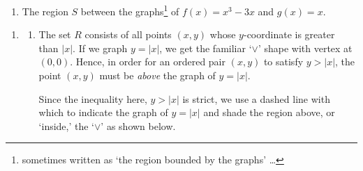 \documentclass{ximera}
\begin{document}
\begin{example}
\begin{enumerate}
\begin{enumerate}
\begin{image}
\end{image}

\item  The region $S$ between the graphs\footnote{sometimes written as `the region bounded by the graphs' \ldots} of $f(x) = x^3-3x$ and $g(x) = x$.


\end{enumerate}


\end{enumerate}

\begin{explanation} 

\begin{enumerate}

\item 

\begin{enumerate}

\item  The set $R$ consists of all points $(x,y)$ whose $y$-coordinate is greater than $|x|$.  If we graph $y=|x|$, we get the familiar `$\vee$' shape with vertex at $(0,0)$.  Hence, in order for an ordered pair $(x,y)$ to satisfy  $y > |x|$,  the point $(x,y)$ must be \textit{above} the graph of $y = |x|$.  

Since the inequality here, $y > |x|$ is strict, we use a dashed line with which to indicate the graph of  $y=|x|$ and shade the region above, or `inside,' the `$\vee$' as shown below.  


\begin{image}
\end{image}
\end{enumerate}
\end{enumerate}
\end{explanation}
\end{example}
\end{document}
